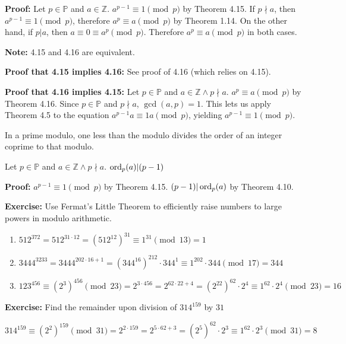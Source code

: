 \textbf{Proof:} Let \(p \in \mathbb P\) and \(a \in \mathbb Z\). \(a^{p-1} \equiv 1 \pmod p\) by Theorem 4.15. If \(p \nmid a\), then \(a^{p-1} \equiv 1 \pmod p\), therefore \(a^p \equiv a \pmod p\) by Theorem 1.14. On the other hand, if \(p | a\), then \(a \equiv 0 \equiv a^p \pmod p\). Therefore \(a^p \equiv a \pmod p\) in both cases.

\item \textbf{Note:} 4.15 and 4.16 are equivalent.

\textbf{Proof that 4.15 implies 4.16:} See proof of 4.16 (which relies on 4.15).

\textbf{Proof that 4.16 implies 4.15:} Let \(p \in \mathbb P\) and \(a \in \mathbb Z \wedge p \nmid a\). \(a^p \equiv a \pmod p\) by Theorem 4.16. Since \(p \in \mathbb P\) and \(p \nmid a\), \(\gcd(a, p) = 1\). This lets us apply Theorem 4.5 to the equation \(a^{p-1} a \equiv 1 a \pmod p\), yielding \(a^{p-1} \equiv 1 \pmod p\).

\item In a prime modulo, one less than the modulo divides the order of an integer coprime to that modulo.

Let \(p \in \mathbb P\) and \(a \in \mathbb Z \wedge p \nmid a\). \(\operatorname{ord}_p(a) | (p-1)\)

\textbf{Proof:} \(a^{p-1} \equiv 1 \pmod p\) by Theorem 4.15. \((p-1)|\operatorname{ord}_p(a)\) by Theorem 4.10.

\item \textbf{Exercise:} Use Fermat's Little Theorem to efficiently raise numbers to large powers in modulo arithmetic.

\begin{enumerate}
\item \(512^{372} = 512^{31 \cdot 12} = (512^{12})^{31} \equiv 1^{31} \pmod{13} = 1\)
\item \(3444^{3233} = 3444^{202 \cdot 16 + 1} = (344^{16})^{212} \cdot 344^1 \equiv 1^{202} \cdot 344 \pmod{17} = 344\)
\item \(123^{456} \equiv (2^3)^{456} \pmod{23} = 2^{3 \cdot 456} = 2^{62 \cdot 22 + 4} = (2^{22})^{62} \cdot 2^4 \equiv 1^{62} \cdot 2^4 \pmod{23} = 16\)
\end{enumerate}

\item \textbf{Exercise:} Find the remainder upon division of \(314^{159}\) by \(31\)

\(314^{159} \equiv (2^2)^{159} \pmod {31} = 2^{2 \cdot 159} = 2^{5 \cdot 62 + 3} = (2^5)^{62} \cdot 2^3 \equiv 1^62 \cdot 2^3 \pmod {31} = 8\)

